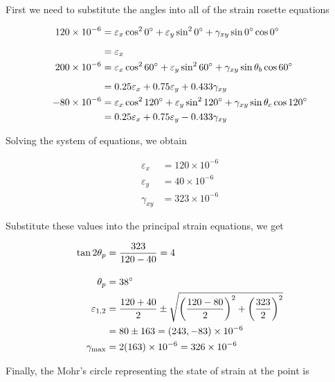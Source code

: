\documentclass[
10pt,
a4paper,
openany,
svgnames,
]{kaobook} %
\begin{document}
\begin{solution}

  First we need to substitute the angles into all of the strain rosette equations

  \begin{align*}
    120 \times 10^{-6} &= \varepsilon_x \cos^2 0\degree + \varepsilon_y \sin^2 0\degree + \gamma_{xy} \sin 0\degree \cos 0\degree \\[5pt]
                       &= \varepsilon_x \\
    200 \times 10^{-6} &= \varepsilon_x \cos^2 60\degree + \varepsilon_y \sin^2 60\degree + \gamma_{xy} \sin \theta_b \cos 60\degree \\[5pt]
                       &= 0.25\varepsilon_x + 0.75\varepsilon_y + 0.433\gamma_{xy} \\
    -80 \times 10^{-6} &= \varepsilon_x \cos^2 120\degree + \varepsilon_y \sin^2 120\degree + \gamma_{xy} \sin \theta_c \cos 120\degree \\
                       &= 0.25\varepsilon_x + 0.75\varepsilon_y -0.433\gamma_{xy}
  \end{align*}

  Solving the system of equations, we obtain

  \begin{align*}
    \varepsilon_x &= 120 \times 10^{-6} \\
    \varepsilon_y &= 40 \times 10^{-6} \\
    \gamma_{xy} &= 323 \times 10^{-6}
  \end{align*}

  Substitute these values into the principal strain equations, we get

  \begin{align*}
    \tan 2\theta_p &= \frac{323}{120 - 40} = 4\\[10pt]
    \theta_p &=  38\degree \\
    \varepsilon_{1,2} &= \frac{120 + 40}{2} \pm \sqrt{ \left( \frac{120 - 80}{2} \right)^2 + \left( \frac{323}{2} \right)^2 } \\
                   &= 80 \pm 163 = (243, -83) \times 10^{-6} \\
    \gamma_{\max} &= 2(163) \times 10^{-6} = 326 \times 10^{-6}
  \end{align*}

  Finally, the Mohr's circle representing the state of strain at the point is


\end{solution}
\end{document}

